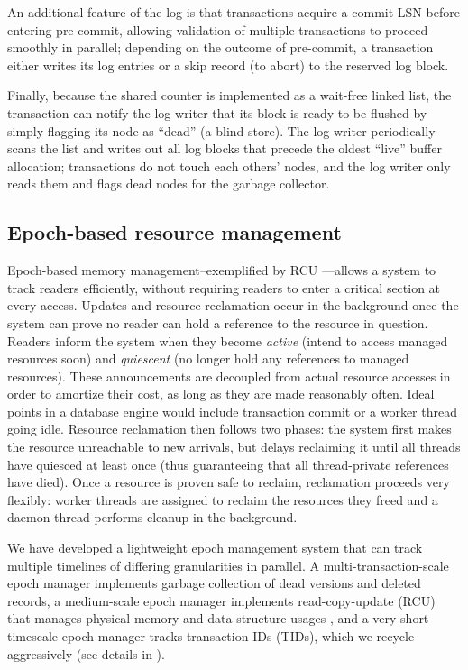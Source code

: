 An additional feature of the log is that transactions acquire a commit LSN before entering pre-commit, allowing validation of multiple transactions to proceed smoothly in parallel; depending on the outcome of pre-commit, a transaction either writes its log entries or a skip record (to abort) to the reserved log block.

Finally, because the shared counter is implemented as a wait-free linked list, the transaction can notify the log writer that its block is ready to be flushed by simply flagging its node as ``dead'' (a blind store). The log writer periodically scans the list and writes out all log blocks that precede the oldest ``live'' buffer allocation; transactions do not touch each others' nodes, and the log writer only reads them and flags dead nodes for the garbage collector.

\subsection{Epoch-based resource management}

Epoch-based memory management--exemplified by RCU \cite{McKenneyS98}---allows a system to track readers efficiently, without requiring readers to enter a critical section at every access. Updates and resource reclamation occur in the background once the system can prove no reader can hold a reference to the resource in question. Readers inform the system when they become {\em active} (intend to access managed resources soon) and {\em quiescent} (no longer hold any references to managed resources). These announcements are decoupled from actual resource accesses in order to amortize their cost, as long as they are made reasonably often. Ideal points in a database engine would include transaction commit or a worker thread going idle. Resource reclamation then follows two phases: the system first makes the resource unreachable to new arrivals, but delays reclaiming it until all threads have quiesced at least once (thus guaranteeing that all thread-private references have died). Once a resource is proven safe to reclaim, reclamation proceeds very flexibly: worker threads are assigned to reclaim the resources they freed and a daemon thread performs cleanup in the background.

We have developed a lightweight epoch management system that can track multiple timelines of differing granularities in parallel. A multi-transaction-scale epoch manager implements garbage collection of dead versions and deleted records, a medium-scale epoch manager implements read-copy-update (RCU) that manages physical memory and data structure usages \cite{McKenneyS98}, and a very short timescale epoch manager tracks transaction IDs (TIDs), which we recycle aggressively (see details in ).

